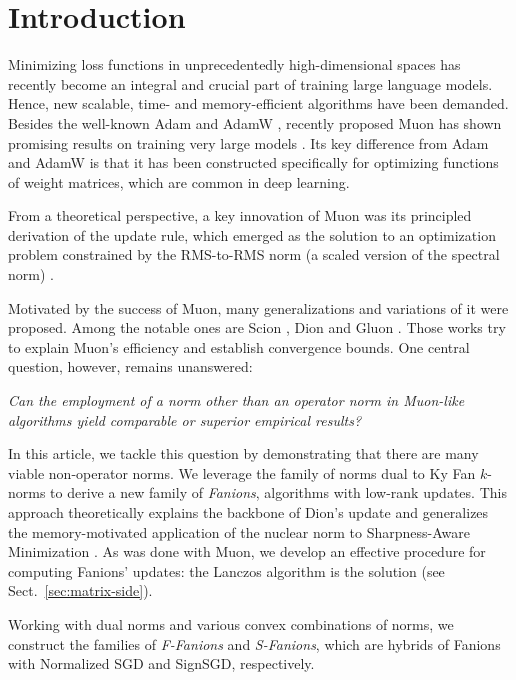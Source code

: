\documentclass[smallextended,referee,envcountsect]{svjour3}
\newcommand{\sectionref}[1]{Sect.~\ref{#1}}
\begin{document}
 
 \section{Introduction}
 
 Minimizing loss functions in unprecedentedly high-dimensional spaces has recently become an integral and crucial part of training large language models. Hence, new scalable, time- and memory-efficient algorithms have been demanded. Besides the well-known Adam \citep{kingma2014adam} and AdamW \citep{loshchilov2017decoupled}, recently proposed Muon \citep{jordan2024muon} has shown promising results on training very large models \citep{liu2025muonscalablellmtraining}. Its key difference from Adam and AdamW is that it has been constructed specifically for optimizing functions of weight matrices, which are common in deep learning.
 
 From a theoretical perspective, a key innovation of Muon was its principled derivation of the update rule, which emerged as the solution to an optimization problem constrained by the RMS-to-RMS norm (a scaled version of the spectral norm) \citep{bernstein2025deriving}.
 
 Motivated by the success of Muon, many generalizations and variations of it were proposed. Among the notable ones are Scion \citep{pethick2025training}, Dion \citep{ahn2025dion} and Gluon \citep{riabinin2025gluon}. Those works try to explain Muon's efficiency and establish convergence bounds. One central question, however, remains unanswered:
 
 \emph{Can the employment of a norm other than an operator norm in Muon-like algorithms yield comparable or superior empirical results?}
 
 In this article, we tackle this question by demonstrating that there are many viable non-operator norms. We leverage the family of norms dual to Ky Fan $k$-norms to derive a new family of \emph{Fanions}, algorithms with low-rank updates. This approach theoretically explains the backbone of Dion's update \citep{ahn2025dion} and generalizes the memory-motivated application of the nuclear norm to Sharpness-Aware Minimization \citep{pethick2025sam}. As was done with Muon, we develop an effective procedure for computing Fanions' updates: the Lanczos algorithm is the solution (see \sectionref{sec:matrix-side}).
 
 Working with dual norms and various convex combinations of norms, we construct the families of \emph{F-Fanions} and \emph{S-Fanions}, which are hybrids of Fanions with Normalized SGD and SignSGD, respectively.
 
\end{document}

